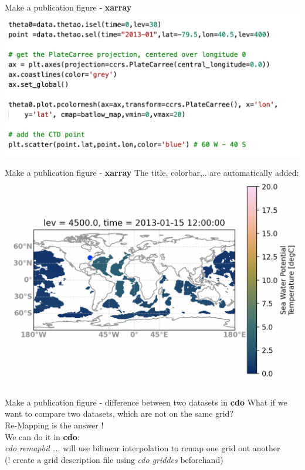 \begin{frame}{\insertsectionnumber{ |} Make a publication figure - \textbf{xarray}}
    \includegraphics[scale=0.35]{images/xarray_2.png}
\end{frame}

\begin{frame}{\insertsectionnumber{ |} Make a publication figure - \textbf{xarray}}
The title, colorbar,.. are automatically added:\\
    \includegraphics[scale=0.50]{images/figure_xarray.png}
\end{frame}

\begin{frame}{\insertsectionnumber{ |} Make a publication figure - difference between two datasets in \textbf{cdo}}
    What if we want to compare two datasets, which are not on the same grid? \\
        \vspace{0.5cm}
    Re-Mapping is the answer !\\
        \vspace{0.5cm}
    We can do it in \textbf{cdo}: \\
    \textit{cdo remapbil ...} will use bilinear interpolation to remap one grid ont another \\
    (! create a grid description file using \textit{cdo griddes} beforehand)\\
\end{frame}


